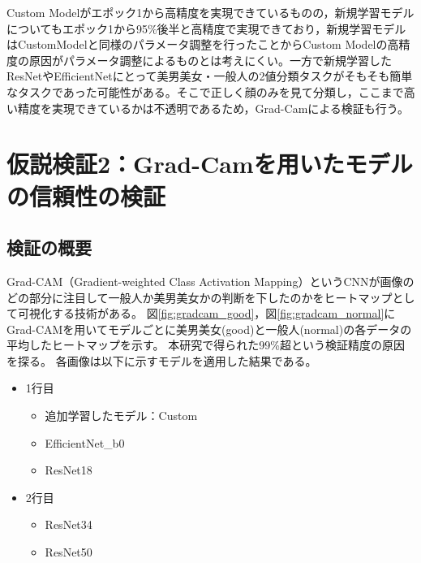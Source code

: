 \documentclass[a4paper,11pt,titlepage]{jsarticle}
\begin{document}

Custom Modelがエポック1から高精度を実現できているものの，新規学習モデルについてもエポック1から95\%後半と高精度で実現できており，新規学習モデルはCustomModelと同様のパラメータ調整を行ったことからCustom Modelの高精度の原因がパラメータ調整によるものとは考えにくい。一方で新規学習したResNetやEfficientNetにとって美男美女・一般人の2値分類タスクがそもそも簡単なタスクであった可能性がある。そこで正しく顔のみを見て分類し，ここまで高い精度を実現できているかは不透明であるため，Grad-Camによる検証も行う。



\clearpage

\section{仮説検証2：Grad-Camを用いたモデルの信頼性の検証}
\label{label:仮説検証2}
\subsection{検証の概要}
Grad-CAM（Gradient-weighted Class Activation Mapping）というCNNが画像のどの部分に注目して一般人か美男美女かの判断を下したのかをヒートマップとして可視化する技術がある。
図\ref{fig:gradcam_good}，図\ref{fig:gradcam_normal}にGrad-CAMを用いてモデルごとに美男美女(good)と一般人(normal)の各データの平均したヒートマップを示す。
本研究で得られた99\%超という検証精度の原因を探る。
各画像は以下に示すモデルを適用した結果である。
\begin{itemize}
	\item 1行目
	\begin{itemize}
	\item 追加学習したモデル：Custom
	\item EfficientNet\_b0
	\item ResNet18
	\end{itemize}
	\item 2行目
	\begin{itemize}
	\item ResNet34
	\item ResNet50
	\end{itemize}
\end{itemize}
\end{document}
